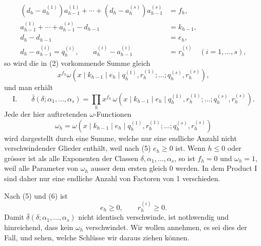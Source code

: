 \documentclass[11pt,a4paper]{article}
\begin{document}
\begin{align}
(d_h-a_h^{(1)})a_{h-1}^{(1)}+\cdots+(d_h-a_h^{(s)})a_{h-1}^{(s)}&=f_h,
\tag{3}\\
a_{h-1}^{(1)}+\cdots+a_{h-1}^{(s)}-d_{h-1}&=k_{h-1},
\tag{4}\\
d_h-d_{h-1}&=e_h,
\tag{5}\\
d_h-a_{h-1}^{(i)}=q_h^{(i)},\qquad a_h^{(i)}-a_{h-1}^{(i)}&=r_h^{(i)}\quad(i=1,\ldots,s),
\tag{6}
\end{align}
so wird die in (2) vorkommende Summe gleich
\[
 x^{f_h}\omega(x\mid k_{h-1}\mid e_h\mid q_h^{(1)},r_h^{(1)};\ldots;q_h^{(s)},r_h^{(s)}),
\]
und man erhält
\[
\text{I.}\qquad
 \bar\delta(\delta;\alpha_1,
\ldots,\alpha_s)=\prod_h x^{f_h}\,
 \omega(x\mid k_{h-1}\mid e_h\mid q_h^{(1)},r_h^{(1)};\ldots;q_h^{(s)},r_h^{(s)}).
\]
Jede der hier auftretenden $\omega$-Functionen
\begin{equation}
 \omega_h=\omega(x\mid k_{h-1}\mid e_h\mid q_h^{(1)},r_h^{(1)};\ldots;q_h^{(s)},r_h^{(s)})
\tag{7}
\end{equation}
wird dargestellt durch eine Summe, welche nur eine endliche Anzahl nicht verschwindender Glieder enthält, weil nach (5) $e_h\ge0$ ist. Wenn $h\le0$ oder grösser ist als alle Exponenten der Classen $\delta,\alpha_1,\ldots,
\alpha_s$, so ist $f_h=0$ und $\omega_h=1$, weil alle Parameter von $\omega_h$ ausser dem ersten gleich 0 werden. In dem Product I sind daher nur eine endliche Anzahl von Factoren von 1 verschieden.

Nach (5) und (6) ist
\begin{equation}
 e_h\ge0,
 \qquad r_h^{(i)}\ge0.
\tag{8}
\end{equation}
Damit $\bar\delta(\delta;\alpha_1,
\ldots,\alpha_s)$ nicht identisch verschwinde, ist nothwendig und hinreichend, dass kein $\omega_h$ verschwindet. Wir wollen annehmen, es sei dies der Fall, und sehen, welche Schlüsse wir daraus ziehen können.
\end{document}
